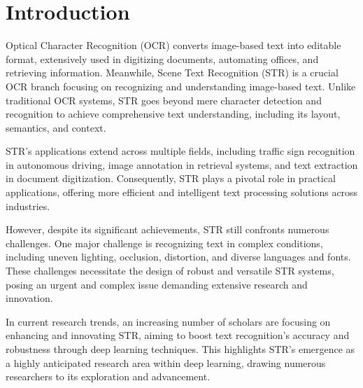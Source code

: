 \documentclass[runningheads]{llncs}
\begin{document}
\section{Introduction}
\label{sec:intro}

Optical Character Recognition (OCR) converts image-based text into editable format, extensively used in digitizing documents, automating offices, and retrieving information.	Meanwhile, Scene Text Recognition (STR) is a crucial OCR branch focusing on recognizing and understanding image-based text.	Unlike traditional OCR systems, STR goes beyond mere character detection and recognition to achieve comprehensive text understanding, including its layout, semantics, and context.	

STR's applications extend across multiple fields, including traffic sign recognition in autonomous driving, image annotation in retrieval systems, and text extraction in document digitization.	Consequently, STR plays a pivotal role in practical applications, offering more efficient and intelligent text processing solutions across industries.	

However, despite its significant achievements, STR still confronts numerous challenges.	One major challenge is recognizing text in complex conditions, including uneven lighting, occlusion, distortion, and diverse languages and fonts.	These challenges necessitate the design of robust and versatile STR systems, posing an urgent and complex issue demanding extensive research and innovation.	

In current research trends, an increasing number of scholars are focusing on enhancing and innovating STR, aiming to boost text recognition's accuracy and robustness through deep learning techniques.	This highlights STR's emergence as a highly anticipated research area within deep learning, drawing numerous researchers to its exploration and advancement.	
\end{document}
